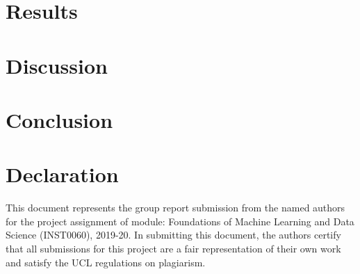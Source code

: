 \documentclass[11point]{article}
\begin{document}
\section{Results}

\section{Discussion}

\section{Conclusion}


\section*{Declaration}
This document represents the group report submission from the named authors for the project assignment of module: Foundations of Machine Learning and Data Science (INST0060), 2019-20. In submitting this document, the authors certify that all submissions for this project are a fair representation of their own work and satisfy the UCL regulations on  plagiarism.



\end{document}
